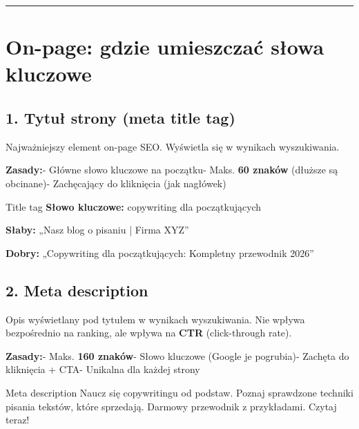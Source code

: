 \documentclass[
  12pt,
  a4paper,
  twoside,
  openright,
  12pt,
  DIV=12,
  BCOR=12mm]{scrbook}
\newcommand{\decoline}{%
  \begin{center}
    \textcolor{bordergray}{\rule{0.3\textwidth}{0.5pt}}
  \end{center}
}
\begin{document}
\decoline

\section{On-page: gdzie umieszczać słowa
kluczowe}\label{on-page-gdzie-umieszczaux107-sux142owa-kluczowe}

\subsection{1. Tytuł strony (meta title
tag)}\label{tytuux142-strony-meta-title-tag}

Najważniejszy element on-page SEO. Wyświetla się w wynikach
wyszukiwania.

\textbf{Zasady:}\newline - Główne słowo kluczowe na początku\newline -
Maks. \textbf{60 znaków} (dłuższe są obcinane)\newline - Zachęcający do
kliknięcia (jak nagłówek)

\begin{przyklad}{Title tag}
\textbf{Słowo kluczowe:} copywriting dla początkujących

\textbf{Słaby:} „Nasz blog o pisaniu | Firma XYZ”

\textbf{Dobry:} „Copywriting dla początkujących: Kompletny przewodnik 2026”
\end{przyklad}

\subsection{2. Meta description}\label{meta-description}

Opis wyświetlany pod tytułem w wynikach wyszukiwania. Nie wpływa
bezpośrednio na ranking, ale wpływa na \textbf{CTR} (click-through
rate).

\textbf{Zasady:}\newline - Maks. \textbf{160 znaków}\newline - Słowo
kluczowe (Google je pogrubia)\newline - Zachęta do kliknięcia +
CTA\newline - Unikalna dla każdej strony

\begin{przyklad}{Meta description}
Naucz się copywritingu od podstaw. Poznaj sprawdzone techniki pisania tekstów, które sprzedają. Darmowy przewodnik z przykładami. Czytaj teraz!
\end{przyklad}
\end{document}
